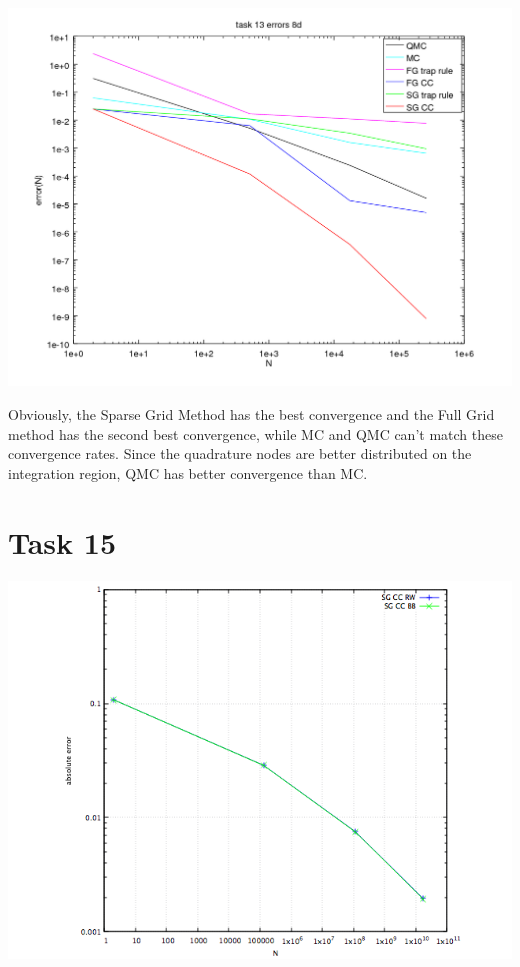 \documentclass[10pt,a4paper]{article}
\begin{document}
\begin{center}
\includegraphics[scale=0.5]{task_13_d8.png}
\end{center}
Obviously, the Sparse Grid Method has the best convergence and the Full
Grid method has the second best convergence, while MC and QMC can't match
these convergence rates. Since the quadrature nodes are better distributed on
the integration region, QMC has better convergence than MC.

\section*{Task 15}
\begin{center}
\includegraphics[scale=0.5]{task15.png}
\end{center}
\end{document}
